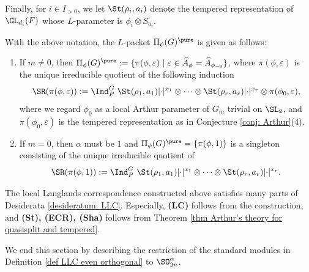 \documentclass[11pt,letterpaper]{amsart}
\numberwithin{equation}{section}
\begin{document}
Finally, for $i \in I_{>0}$, we let $\St(\rho_i,a_i)$ denote the tempered representation of $\GL_{d_i}(F)$ whose $L$-parameter is $\phi_i \otimes S_{a_i}$. 
\begin{definition}\label{def LLC even orthogonal}
    With the above notation, the $L$-packet $\Pi_{\phi} (G)^\pure$ is given as follows:
    \begin{enumerate}
        \item If $m \neq 0$, then $\Pi_{\phi}(G)^\pure:=\{\pi(\phi,\varepsilon)\ | \ \varepsilon \in \widehat{A}_{\phi}= \widehat{A}_{\phi_{=0}}\}$, where $\pi(\phi, \varepsilon)$ is the unique irreducible quotient of the following induction
        \[ \SR(\pi(\phi,\varepsilon)):= \Ind_{P}^G  \ \St(\rho_1,a_1)\lvert\cdot\rvert^{x_1} \otimes \cdots \otimes \St(\rho_r,a_r)\lvert\cdot\rvert^{x_r} \otimes \pi(\phi_0, \varepsilon),  \]
        where we regard $\phi_0$ as a local Arthur parameter of $G_m$ trivial on $\SL_2$, and $\pi(\phi_0,\varepsilon)$ is the tempered representation as in Conjecture \ref{conj: Arthur}(4).
        \item If $m=0$, then $\alpha$ must be $1$ and
        $\Pi_{\phi}(G)^\pure=\{\pi(\phi,1)\}$ is a singleton consisting of the unique irreducible quotient of 
        \[\SR(\pi(\phi,1)):=\Ind_{P}^G \ \St(\rho_1,a_1)\lvert\cdot\rvert^{x_1} \otimes \cdots \otimes \St(\rho_r,a_r)\lvert\cdot\rvert^{x_r}.\]
    \end{enumerate}
\end{definition}
The local Langlands correspondence constructed above satisfies many parts of Desiderata \ref{desideratum: LLC}. Especially, \textbf{(LC)} follows from the construction, and \textbf{(St), (ECR), (Sha)} follows from Theorem \ref{thm Arthur's theory for quasisplit and tempered}. 

We end this section by describing the restriction of the standard modules in Definition \ref{def LLC even orthogonal} to $\SO_{2n}^{\alpha}$.
\end{document}

